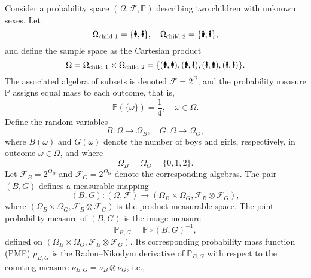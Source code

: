 \begin{example}
	Consider a probability space $(\Omega, \mathcal{F}, \mathbb{P})$ describing two children with unknown sexes. Let
	\begin{equation}
		\Omega_{\text{child 1}} = \{\text{\Gentsroom}, \text{\Ladiesroom}\}, \quad
		\Omega_{\text{child 2}} = \{\text{\Gentsroom}, \text{\Ladiesroom}\},
	\end{equation}
	and define the sample space as the Cartesian product
	\begin{equation}
		\Omega = \Omega_{\text{child 1}} \times \Omega_{\text{child 2}} =
		\{(\text{\Gentsroom},\text{\Gentsroom}), (\text{\Gentsroom},\text{\Ladiesroom}), (\text{\Ladiesroom},\text{\Gentsroom}), (\text{\Ladiesroom},\text{\Ladiesroom})\}.
	\end{equation}
	The associated algebra of subsets is denoted $\mathcal{F} = 2^{\Omega}$, and the probability measure $\mathbb{P}$ assigns equal mass to each outcome, that is,
	\begin{equation}
		\mathbb{P}(\{\omega\}) = \frac{1}{4}, \quad \omega \in \Omega.
	\end{equation}
	Define the random variables
	\begin{equation}
		B \colon \Omega \to \Omega_B, \quad G \colon \Omega \to \Omega_G,
	\end{equation}
	where $B(\omega)$ and $G(\omega)$ denote the number of boys and girls, respectively, in outcome $\omega \in \Omega$, and where
	\begin{equation}
		\Omega_B = \Omega_G = \{0,1,2\}.
	\end{equation}
	Let $\mathcal{F}_B = 2^{\Omega_B}$ and $\mathcal{F}_G = 2^{\Omega_G}$ denote the corresponding algebras. The pair $(B,G)$ defines a measurable mapping
	\begin{equation}
		(B,G)\colon (\Omega, \mathcal{F}) \to (\Omega_B \times \Omega_G, \mathcal{F}_B \otimes \mathcal{F}_G),
	\end{equation}
	where $(\Omega_B \times \Omega_G, \mathcal{F}_B \otimes \mathcal{F}_G)$ is the product measurable space.	The joint probability measure of $(B,G)$ is the image measure
	\begin{equation}
		\mathbb{P}_{B,G} = \mathbb{P} \circ (B,G)^{-1},
	\end{equation}
	defined on $(\Omega_B \times \Omega_G, \mathcal{F}_B \otimes \mathcal{F}_G)$.
	Its corresponding probability mass function (PMF) $p_{B,G}$ is the Radon–Nikodym derivative of $\mathbb{P}_{B,G}$ with respect to the counting measure $\nu_{B,G} = \nu_B \otimes \nu_G$, i.e.,

\end{example}
